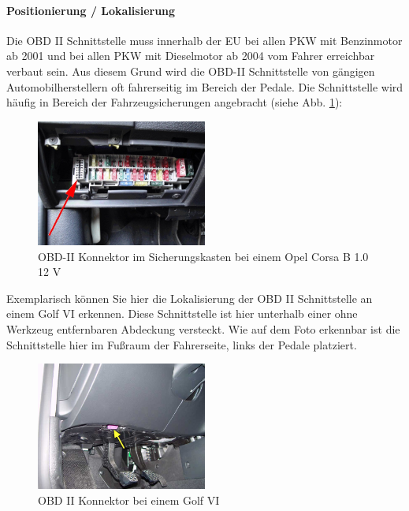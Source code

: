 \paragraph{Positionierung / Lokalisierung\nextline}
Die OBD II Schnittstelle muss innerhalb der EU bei allen PKW mit Benzinmotor ab 2001 und bei allen PKW mit Dieselmotor ab 2004 vom Fahrer erreichbar verbaut sein. Aus diesem Grund wird die OBD-II Schnittstelle von gängigen Automobilherstellern oft fahrerseitig im Bereich der Pedale. Die Schnittstelle wird häufig in  Bereich der Fahrzeugsicherungen angebracht (siehe Abb. \ref{Fig:imgOBDSicherungskasten}):
\begin{figure}[!htb]\centering
	\includegraphics[width=0.5\textwidth]{images/obdSicherungskasten}
	\caption{OBD-II Konnektor im Sicherungskasten bei einem Opel Corsa B 1.0 12 V \cite{SIMR.CH3-obd2.OBDSicherungskasten}}\label{Fig:imgOBDSicherungskasten}
\end{figure}
Exemplarisch können Sie hier die Lokalisierung der OBD II Schnittstelle an einem Golf VI erkennen. Diese Schnittstelle ist hier unterhalb einer ohne Werkzeug entfernbaren Abdeckung versteckt. Wie auf dem Foto erkennbar ist die Schnittstelle hier im Fußraum der Fahrerseite, links der Pedale platziert.

\begin{figure}[!htb]\centering
	\includegraphics[width=0.5\textwidth]{images/golfobd}
	\caption{OBD II Konnektor bei einem Golf VI \cite{SIMR.CH2-obd2.GolfOBD}}\label{Fig:Data3}
\end{figure}

